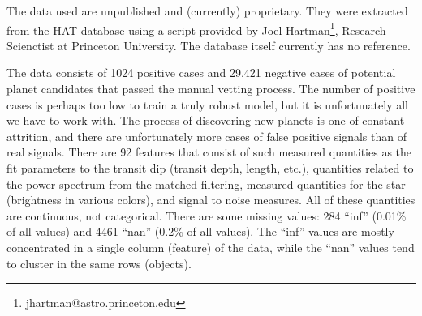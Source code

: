 The data used are unpublished and (currently) proprietary.  They were extracted from the HAT database using a script provided by Joel Hartman\footnote{jhartman@astro.princeton.edu}, Research Scienctist at Princeton University.  The database itself currently has no reference.

The data consists of 1024 positive cases and 29,421 negative cases of potential planet candidates that passed the manual vetting process.  The number of positive cases is perhaps too low to train a truly robust model, but it is unfortunately all we have to work with.  The process of discovering new planets is one of constant attrition, and there are unfortunately more cases of false positive signals than of real signals.  There are 92 features that consist of such measured quantities as the fit parameters to the transit dip (transit depth, length, etc.), quantities related to the power spectrum from the matched filtering, measured quantities for the star (brightness in various colors), and signal to noise measures.  All of these quantities are  continuous, not categorical.  There are some missing values: 284 ``inf'' (0.01\% of all values) and 4461 ``nan'' (0.2\% of all values).  The ``inf'' values are mostly concentrated in a single column (feature) of the data, while the ``nan'' values tend to cluster in the same rows (objects).